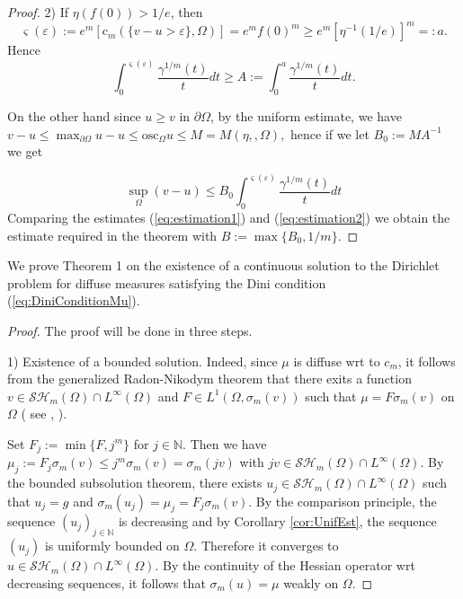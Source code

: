\documentclass[12pt]{amsart}
\theoremstyle{definition}
\numberwithin{theorem}{section}
\numberwithin{equation}{section}
\newcommand{\N}{\mathbb{N}}
\begin{document}
{\begin{proof}
2) If  $\eta (f (0)) > 1 \slash e$, then 
$$ \varsigma  (\varepsilon) := e^m  \left[\mathrm{c} _{m} (\{v - u>\varepsilon\}, \Omega)\right] = e^m f (0)^m  \geq   e^m \left[\eta^{-1} (1 \slash e)\right]^m =: a.
$$
  Hence
$$
\int_0^{\varsigma  (\varepsilon)} \frac{\gamma^{1 \slash m} (t)}{t} d t \geq A := \int_0^{ a} \frac{\gamma^{1 \slash m} (t)}{t} d t.
$$


On the other hand since $u \geq v$ in $\partial \Omega$, by the uniform estimate, we have 
$v - u \leq \max_{\partial \Omega} u - u \leq \mathrm{osc}_{\Omega} u \leq M  = M (\eta,,\Omega),$ hence if we let $B_0:= M  A^{-1}$ we get

\begin{equation} \label{eq:estimation2}
\sup_{\Omega} (v-u) \leq  B_0 \int_0^{\varsigma  (\varepsilon)} \frac{\gamma^{1 \slash m} (t)}{t} d t 
\end{equation}
Comparing the estimates (\ref{eq:estimation1}) and (\ref{eq:estimation2}) we obtain the estimate required in the theorem with  
$B := \max \{B_0,1 \slash m\}$.
\end{proof}


We prove Theorem 1 on the existence of a continuous solution to the Dirichlet problem for diffuse measures satisfying the Dini condition (\ref{eq:DiniConditionMu}).



\begin{proof} The proof will be done in three steps.

1) Existence of a bounded solution. Indeed, since $\mu$ is diffuse wrt to $c_m$, it follows from the generalized Radon-Nikodym theorem that there exits a function $v \in \mathcal{SH}_m (\Omega) \cap L^{\infty} (\Omega)$ and $F \in L^1 (\Omega,\sigma_m(v))$ such that $\mu = F \sigma_m (v)$ on $\Omega$ ( see  \cite{Ceg98}, \cite{Lu12}).

  Set $F_j := \min \{F,j^m\}$  for $j \in \N$. Then we have $\mu_j := F_j \sigma_m (v) \leq j^m \sigma_m (v) = \sigma_m (j v)$ with $j v  \in  \mathcal{SH}_m (\Omega) \cap L^{\infty} (\Omega)$. By the bounded subsolution theorem, there exists 
$u_j \in \mathcal{SH}_m (\Omega) \cap L^{\infty} (\Omega)$ such that $u_j = g$ and $\sigma_m (u_j) = \mu_j = F_j \sigma_m (v)$.
By the comparison principle, the sequence $(u_j)_{j \in \N}$ is decreasing and by Corollary \ref{cor:UnifEst}, the sequence $(u_j)$ is uniformly bounded on $\Omega$. Therefore it converges to $u \in  \mathcal{SH}_m (\Omega) \cap L^{\infty} (\Omega)$. By the continuity of the Hessian operator wrt decreasing sequences, it follows that $\sigma_m (u) = \mu$ weakly on $\Omega$.


\end{proof}}
\end{document}
